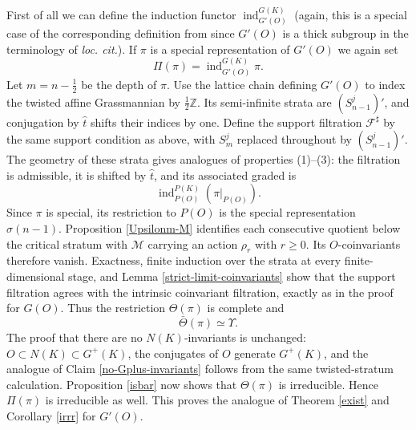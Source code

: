 \documentclass[11pt,a4paper,twoside]{amsart}
\theoremstyle{definition}
\theoremstyle{remark}
\newcommand{\bs}{\sigma}
\newcommand{\mcF}{\mathcal F}
\newcommand{\mcM}{\mathcal M}
\newcommand{\ZZ}{\mathbb Z}
\newcommand{\ind}{\operatorname{ind}}
\begin{document}
First of all we can define the induction functor $\ind_{G'(O)}^{G(K)}$ (again, this is a special case of the corresponding definition from \cite{GK} since $G'(O)$ is a thick subgroup in the terminology of {\em loc. cit.}). If $\pi$ is a special representation of $G'(O)$ we again set
$$
\Pi(\pi)=\ind_{G'(O)}^{G(K)}\pi.
$$
Let $m=n-\frac12$ be the depth of $\pi$. Use the lattice chain defining $G'(O)$ to index the twisted affine Grassmannian by $\frac12\ZZ$. Its semi-infinite strata are $(S^j_{n-1})'$, and conjugation by $\widehat t$ shifts their indices by one. Define the support filtration $\mcF^\sharp$ by the same support condition as above, with $S_m^j$ replaced throughout by $(S^j_{n-1})'$. The geometry of these strata gives analogues of properties (1)--(3): the filtration is admissible, it is shifted by $\widehat t$, and its associated graded is
$$
\ind_{P(O)}^{P(K)}(\pi|_{P(O)}).
$$
Since $\pi$ is special, its restriction to $P(O)$ is the special representation $\bs(n-1)$. Proposition \ref{Upsilonm-M} identifies each consecutive quotient below the critical stratum with $\mcM$ carrying an action $\rho_r$ with $r\geq0$. Its $O$-coinvariants therefore vanish. Exactness, finite induction over the strata at every finite-dimensional stage, and Lemma \ref{strict-limit-coinvariants} show that the support filtration agrees with the intrinsic coinvariant filtration, exactly as in the proof for $G(O)$. Thus the restriction $\Theta(\pi)$ is complete and
$$
\bar\Theta(\pi)\simeq\Upsilon.
$$
The proof that there are no $N(K)$-invariants is unchanged: $O\subset N(K)\subset G^+(K)$, the conjugates of $O$ generate $G^+(K)$, and the analogue of Claim \ref{no-Gplus-invariants} follows from the same twisted-stratum calculation. Proposition \ref{isbar} now shows that $\Theta(\pi)$ is irreducible. Hence $\Pi(\pi)$ is irreducible as well. This proves the analogue of Theorem \ref{exist} and Corollary \ref{irrr} for $G'(O)$.
\end{document}
